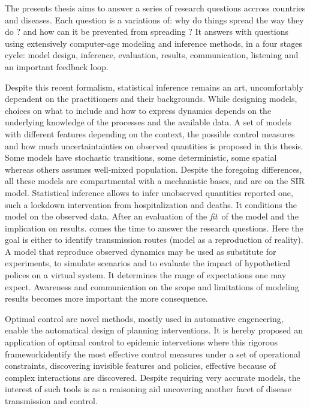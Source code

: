 The presents thesis aims to answer a series of research questions accross countries and diseases. Each question is a variations of: why do things spread the way they do ? and how can it be prevented from spreading ? It answers with questions using extensively computer-age modeling and inference methods, in a four stages cycle: model design, inference, evaluation, results, communication, listening and an important feedback loop.

Despite this recent formalism, statistical inference remains an art, uncomfortably dependent on the practitioners and their backgrounds. While designing models, choices on what to include and how to express dynamics depends on the underlying knowledge of the processes and the available data. A set of models with different features depending on the context, the possible control measures and how much uncertaintainties on observed quantities is proposed in this thesis.  Some models have stochastic transitions, some deterministic, some spatial whereas others assumes well-mixed population. Despite the foregoing differences, all these models are compartmental with a mechanistic bases, and are on the SIR model. 
Statistical inference allows to infer unobserved quantities reported one, such a lockdown intervention from hospitalization and deaths. It conditions the model on the observed data. After an evaluation of the \textit{fit} of the model and the implication on results. comes the time to answer the research questions. Here the goal is  either to identify transmission routes (model as a reproduction of reality). A model that reproduce observed dynamics may be used as substitute for experiments, to simulate scenarios and to evaluate the impact of hypothetical polices on a virtual system. It determines the range of expectations one may expect. Awareness and communication on the scope and limitations of modeling results becomes more important the more consequence. 

Optimal control are novel methods, mostly used in automative engeneering, enable the automatical design of planning interventions. It is hereby proposed an application of optimal control to epidemic intervetions where this rigorous frameworkidentify the most effective control measures under a set of operational constraints, discovering invisible features and policies, effective because of complex interactions are discovered. Despite requiring very accurate models, the interest of such tools is as a reaisoning aid uncovering another facet of disease transmission and control.

